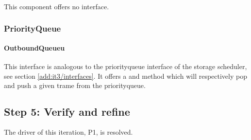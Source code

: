 \npar This component offers no interface.

\subsubsection{PriorityQueue}

\paragraph{OutboundQueueu}

\npar This interface is analogous to the priorityqueue interface of the storage
scheduler, see section \ref{add:it3/interfaces}. It offers a 
and  method which will respectively pop and push a given
trame from the priorityqueue.

\subsection{Step 5: Verify and refine}
\label{add:it6/verification}

\npar The driver of this iteration, P1, is resolved.
